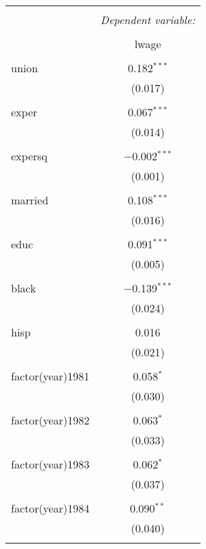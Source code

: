 
\begin{table}[!htbp] \centering 
  \caption{} 
  \label{} 
\begin{tabular}{@{\extracolsep{5pt}}lc} 
\\[-1.8ex]\hline 
\hline \\[-1.8ex] 
 & \multicolumn{1}{c}{\textit{Dependent variable:}} \\ 
\cline{2-2} 
\\[-1.8ex] & lwage \\ 
\hline \\[-1.8ex] 
 union & 0.182$^{***}$ \\ 
  & (0.017) \\ 
  & \\ 
 exper & 0.067$^{***}$ \\ 
  & (0.014) \\ 
  & \\ 
 expersq & $-$0.002$^{***}$ \\ 
  & (0.001) \\ 
  & \\ 
 married & 0.108$^{***}$ \\ 
  & (0.016) \\ 
  & \\ 
 educ & 0.091$^{***}$ \\ 
  & (0.005) \\ 
  & \\ 
 black & $-$0.139$^{***}$ \\ 
  & (0.024) \\ 
  & \\ 
 hisp & 0.016 \\ 
  & (0.021) \\ 
  & \\ 
 factor(year)1981 & 0.058$^{*}$ \\ 
  & (0.030) \\ 
  & \\ 
 factor(year)1982 & 0.063$^{*}$ \\ 
  & (0.033) \\ 
  & \\ 
 factor(year)1983 & 0.062$^{*}$ \\ 
  & (0.037) \\ 
  & \\ 
 factor(year)1984 & 0.090$^{**}$ \\ 
  & (0.040) \\ 
  & \\ 

\end{tabular}
\end{table}
